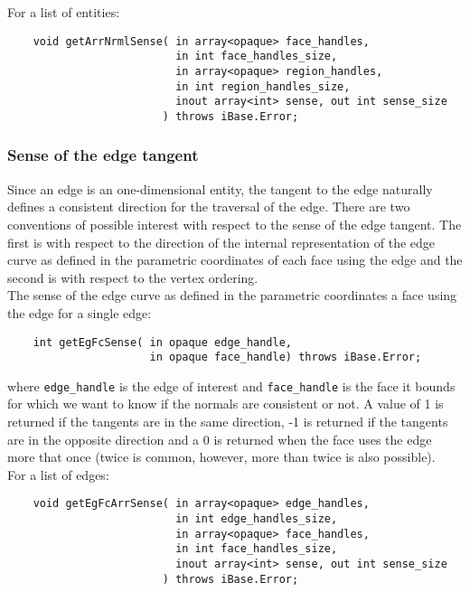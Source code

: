 \documentclass{article}
\begin{document}
\hspace{-16pt}For a list of entities:

\begin{verbatim}
    void getArrNrmlSense( in array<opaque> face_handles, 
                          in int face_handles_size, 
                          in array<opaque> region_handles, 
                          in int region_handles_size, 
                          inout array<int> sense, out int sense_size
                        ) throws iBase.Error;
\end{verbatim}

\subsubsection{Sense of the edge tangent}
Since an edge is an one-dimensional entity, the tangent to 
the edge naturally defines a consistent direction for the traversal 
of the edge. There are two conventions of possible interest with 
respect to the sense of the edge tangent. The first is with respect 
to the direction of the internal representation of the edge curve 
as defined in the parametric coordinates of each face using the 
edge and the second is with respect to the vertex ordering.\\


The sense of the edge curve as defined in the parametric 
coordinates a face using the edge for a single edge:

\begin{verbatim}
    int getEgFcSense( in opaque edge_handle, 
                      in opaque face_handle) throws iBase.Error;
\end{verbatim}
where {\tt edge\_handle} is the edge of interest and {\tt face\_handle} is 
the face it bounds for which we want to know if the normals are 
consistent or not. A value of 1 is returned if the tangents are 
in the same direction, -1 is returned if the tangents are in 
the opposite direction and a 0 is returned when the face uses 
the edge more that once (twice is common, however, more than 
twice is also possible).\\

\hspace{-16pt}For a list of edges:

\begin{verbatim}
    void getEgFcArrSense( in array<opaque> edge_handles, 
                          in int edge_handles_size, 
                          in array<opaque> face_handles, 
                          in int face_handles_size, 
                          inout array<int> sense, out int sense_size
                        ) throws iBase.Error;
\end{verbatim}
\end{document}
